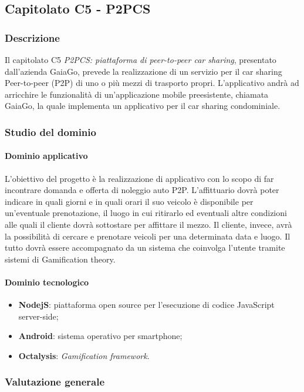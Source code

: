 {	\subsection{Capitolato C5 - P2PCS}
\subsubsection{Descrizione}
Il capitolato C5 \emph{P2PCS: piattaforma di peer-to-peer car sharing}, presentato dall'azienda GaiaGo, prevede la realizzazione di un servizio per il car sharing Peer-to-peer (P2P) di uno o più mezzi di trasporto propri. L'applicativo andrà ad arricchire le funzionalità di un'applicazione mobile preesistente, chiamata GaiaGo, la quale implementa un applicativo per il car sharing condominiale.
\subsubsection{Studio del dominio}
\paragraph{Dominio applicativo} \Spazio
L'obiettivo del progetto è la realizzazione di applicativo con lo scopo di far incontrare domanda e offerta di noleggio auto P2P. L'affittuario dovrà poter indicare in quali giorni e in quali orari il suo veicolo è disponibile per un'eventuale prenotazione, il luogo in cui ritirarlo ed eventuali altre condizioni alle quali il cliente dovrà sottostare per affittare il mezzo. Il cliente, invece, avrà la possibilità di cercare e prenotare veicoli per una determinata data e luogo. Il tutto dovrà essere accompagnato da un sistema che coinvolga l'utente tramite sistemi di Gamification theory.
\paragraph{Dominio tecnologico} 
\begin{itemize}
	\item  \textbf{NodejS}: piattaforma open source per l'esecuzione di codice JavaScript server-side;
	\item \textbf{Android}: sistema operativo per smartphone;
	\item \textbf{Octalysis}: \emph{Gamification framework}.
\end{itemize}
\pagebreak
\subsubsection{Valutazione generale}
}

